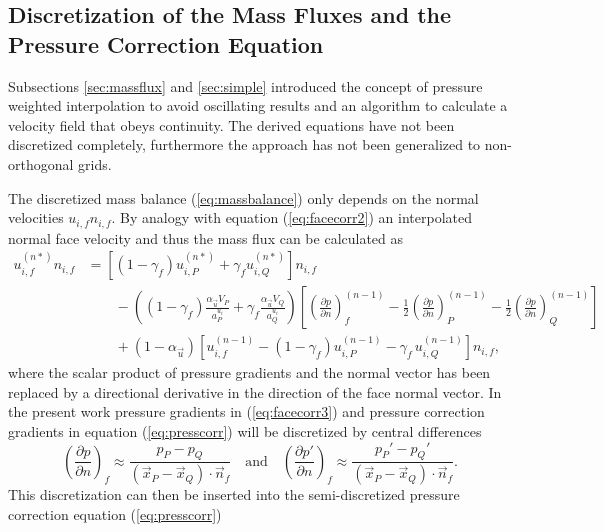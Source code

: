 \subsection{Discretization of the Mass Fluxes and the Pressure Correction Equation}
\label{sec:segpresscorr}

Subsections \ref{sec:massflux} and \ref{sec:simple} introduced the concept of pressure weighted interpolation to avoid oscillating results and an algorithm to calculate a velocity field that obeys continuity. The derived equations have not been discretized completely, furthermore the approach has not been generalized to non-orthogonal grids.

The discretized mass balance (\ref{eq:massbalance}) only depends on the normal velocities \(u_{i,f} n_{i,f}\). By analogy with equation (\ref{eq:facecorr2}) an interpolated normal face velocity and thus the mass flux can be calculated as
\begin{align}
  \label{eq:facecorr3}
  u_{i,f}^{(n*)} n_{i,f}
  &=
  \left[\left(1 - \gamma_f\right) u_{i,P}^{(n*)} + \gamma_f u_{i,Q}^{(n*)} \right]n_{i,f} \nonumber\\[1em]
  &\quad\quad - 
  \left(\left(1 - \gamma_f\right) \frac{\alpha_\vec{u} V_P}{a_P^{u_i}} + \gamma_f \frac{\alpha_\vec{u} V_Q}{a_Q^{u_i}}\right)
  \left[ 
  \left(\frac{\partial p}{\partial n}\right)_f^{(n-1)} 
  -  \frac{1}{2} \left( \frac{\partial p}{\partial n} \right)_P^{(n-1)} 
  -  \frac{1}{2} \left(\frac{\partial p}{\partial n}\right)_Q^{(n-1)} 
\right] \nonumber \\[1em]
&\quad\quad + \left(1 - \alpha_\vec{u}\right) \left[ u_{i,f}^{(n-1)} - \left(1 - \gamma_f\right) u_{i,P}^{(n-1)} - \gamma_f \, u_{i,Q}^{(n-1)} \right] n_{i,f},
\end{align}
where the scalar product of pressure gradients and the normal vector has been replaced by a directional derivative in the direction of the face normal vector. In the present work pressure gradients in (\ref{eq:facecorr3}) and pressure correction gradients in equation (\ref{eq:presscorr}) will be discretized by central differences
\begin{displaymath}
\left(\frac{\partial p}{\partial n}\right)_f \approx \frac{p_P - p_Q}{\left(\vec{x}_P - \vec{x}_Q\right)\cdot \vec{n}_f} 
\quad \text{and} \quad 
\left(\frac{\partial p'}{\partial n}\right)_f \approx \frac{p_P' - p_Q'}{\left(\vec{x}_P - \vec{x}_Q\right)\cdot \vec{n}_f}.
\end{displaymath}
This discretization can then be inserted into the semi-discretized pressure correction equation (\ref{eq:presscorr}) 
